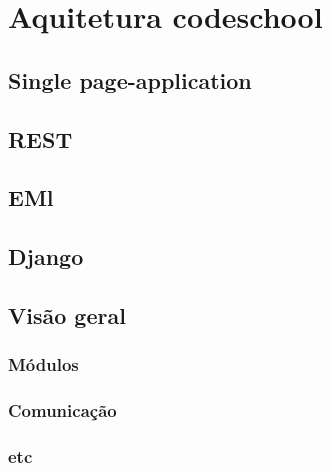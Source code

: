 \chapter[Aquitetura codeschool]{Aquitetura codeschool}
\section{Single page-application}

\section{REST}

\section{EMl}

\section{Django}

\section{Visão geral}
\subsection{Módulos}
\subsection{Comunicação}
\subsection{etc}